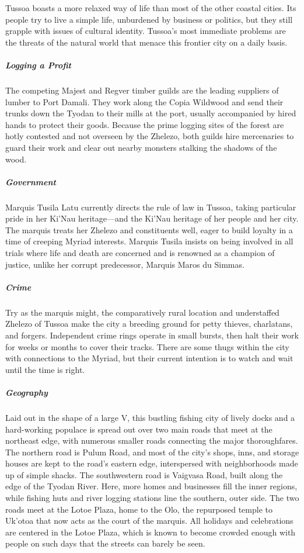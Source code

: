 \documentclass[10pt,a4paper,twoside,bg=print,twocolumn,openany,nodeprecatedcode]{dndbook}
\begin{document}
Tussoa boasts a more relaxed way of life than most of the other coastal cities. Its people try to live a simple life, unburdened by business or politics, but they still grapple with issues of cultural identity. Tussoa's most immediate problems are the threats of the natural world that menace this frontier city on a daily basis.

\subparagraph{Logging a Profit}
The competing Majest and Regver timber guilds are the leading suppliers of lumber to Port Damali. They work along the Copia Wildwood and send their trunks down the Tyodan to their mills at the port, usually accompanied by hired hands to protect their goods. Because the prime logging sites of the forest are hotly contested and not overseen by the Zhelezo, both guilds hire mercenaries to guard their work and clear out nearby monsters stalking the shadows of the wood.

\subparagraph{Government}
Marquis Tusila Latu currently directs the rule of law in Tussoa, taking particular pride in her Ki'Nau heritage—and the Ki'Nau heritage of her people and her city. The marquis treats her Zhelezo and constituents well, eager to build loyalty in a time of creeping Myriad interests. Marquis Tusila insists on being involved in all trials where life and death are concerned and is renowned as a champion of justice, unlike her corrupt predecessor, Marquis Maros du Simmas.

\subparagraph{Crime}
Try as the marquis might, the comparatively rural location and understaffed Zhelezo of Tussoa make the city a breeding ground for petty thieves, charlatans, and forgers. Independent crime rings operate in small bursts, then halt their work for weeks or months to cover their tracks. There are some thugs within the city with connections to the Myriad, but their current intention is to watch and wait until the time is right.

\subparagraph{Geography}
Laid out in the shape of a large V, this bustling fishing city of lively docks and a hard-working populace is spread out over two main roads that meet at the northeast edge, with numerous smaller roads connecting the major thoroughfares. The northern road is Pulum Road, and most of the city's shops, inns, and storage houses are kept to the road's eastern edge, interspersed with neighborhoods made up of simple shacks. The southwestern road is Vaigvasa Road, built along the edge of the Tyodan River. Here, more homes and businesses fill the inner regions, while fishing huts and river logging stations line the southern, outer side. The two roads meet at the Lotoe Plaza, home to the Olo, the repurposed temple to Uk'otoa that now acts as the court of the marquis. All holidays and celebrations are centered in the Lotoe Plaza, which is known to become crowded enough with people on such days that the streets can barely be seen.
\end{document}
